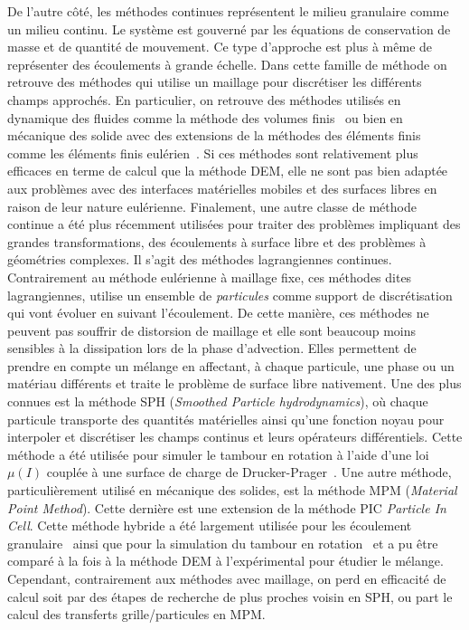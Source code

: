 De l'autre côté, les méthodes continues représentent le milieu granulaire comme un milieu continu. Le système est gouverné par les équations de conservation de masse et de quantité de mouvement. Ce type d'approche est plus à même de représenter des écoulements à grande échelle. Dans cette famille de méthode on retrouve des méthodes qui utilise un maillage pour discrétiser les différents champs approchés. En particulier, on retrouve des méthodes utilisés en dynamique des fluides comme la méthode des volumes finis~\cite{Santos2013,arseni_granular_2020} ou bien en mécanique des solide avec des extensions de la méthodes des éléments finis comme les éléments finis eulérien~\cite{ZHENG2015361}. Si ces méthodes sont relativement plus efficaces en terme de calcul que la méthode DEM, elle ne sont pas bien adaptée aux problèmes avec des interfaces matérielles mobiles et des surfaces libres en raison de leur nature eulérienne. Finalement, une autre classe de méthode continue a été plus récemment utilisées pour traiter des problèmes impliquant des grandes transformations, des écoulements à surface libre et des problèmes à géométries complexes. Il s'agit des méthodes lagrangiennes continues. Contrairement au méthode eulérienne à maillage fixe, ces méthodes dites lagrangiennes, utilise un ensemble de \textit{particules} comme support de discrétisation qui vont évoluer en suivant l'écoulement. De cette manière, ces méthodes ne peuvent pas souffrir de distorsion de maillage et elle sont beaucoup moins sensibles à la dissipation lors de la phase d'advection. Elles permettent de prendre en compte un mélange en affectant, à chaque particule, une phase ou un matériau différents et traite le problème de surface libre nativement. Une des plus connues est la méthode SPH (\textit{Smoothed Particle hydrodynamics}), où chaque particule transporte des quantités matérielles ainsi qu'une fonction noyau pour interpoler et discrétiser les champs continus et leurs opérateurs différentiels. Cette méthode a été utilisée pour simuler le tambour en rotation à l'aide d'une loi $\mu(I)$ couplée à une surface de charge de Drucker-Prager~\cite{zhu_lagrangian_2022}. Une autre méthode, particulièrement utilisé en mécanique des solides, est la méthode MPM (\textit{Material Point Method}). Cette dernière est une extension de la méthode PIC \textit{Particle In Cell}. Cette méthode hybride a été largement utilisée pour les écoulement granulaire~\cite{KUMAR201794} ainsi que pour la simulation du tambour en rotation~\cite{zuo_numerical_2020, chandra_nonconforming_2021} et a pu être comparé à la fois à la méthode DEM à l'expérimental pour étudier le mélange. Cependant, contrairement aux méthodes avec maillage, on perd en efficacité de calcul soit par des étapes de recherche de plus proches voisin en SPH, ou part le calcul des transferts grille/particules en MPM.

